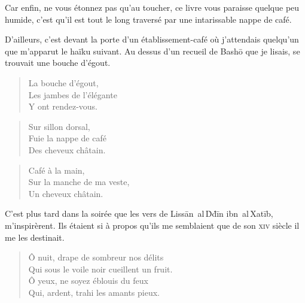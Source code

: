 \begin{prose}
Car enfin, ne vous étonnez pas qu’au toucher, ce livre vous paraisse quelque peu humide, c’est qu’il est tout le long traversé par une intarissable nappe de café.
\end{prose}

\begin{prose}
D’ailleurs, c’est devant la porte d’un établissement-café où j’attendais quelqu’un que m’apparut le haïku suivant. Au dessus d’un recueil de Bashō que je lisais, se trouvait une bouche d’égout.
\end{prose}

\begin{verse}
La bouche d’égout,\\
Les jambes de l’élégante\\
Y ont rendez-vous.
\end{verse}

\begin{verse}
Sur sillon dorsal,\\
Fuie la nappe de café\\
Des cheveux châtain.
\end{verse}

\begin{verse}
Café à la main,\\
Sur la manche de ma veste,\\
Un cheveux châtain.
\end{verse}

\begin{prose}
C’est plus tard dans la soirée que les vers de Lissān~al\,Ḋḋīn ibn~al\,Xatīb, m’inspirèrent. Ils étaient si à propos qu’ils me semblaient que de son \textsc{xiv}\ieme{} siècle il me les destinait.
\end{prose}

\begin{verse}
Ô nuit, drape de sombreur nos délits\\
Qui sous le voile noir cueillent un fruit.\\
Ô yeux\label{foot.vocaliseYeuxNuit}, ne soyez  éblouis du feux\\
Qui, ardent, trahi les amants pieux.
\end{verse}


